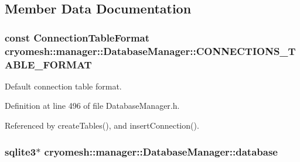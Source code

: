\subsection{\-Member \-Data \-Documentation}
\hypertarget{classcryomesh_1_1manager_1_1DatabaseManager_ad318d1adc10df5e9ad8a55252b627456}{
\subsubsection[{\-C\-O\-N\-N\-E\-C\-T\-I\-O\-N\-S\-\_\-\-T\-A\-B\-L\-E\-\_\-\-F\-O\-R\-M\-A\-T}]{\setlength{\rightskip}{0pt plus 5cm}const {\bf \-Connection\-Table\-Format} {\bf cryomesh\-::manager\-::\-Database\-Manager\-::\-C\-O\-N\-N\-E\-C\-T\-I\-O\-N\-S\-\_\-\-T\-A\-B\-L\-E\-\_\-\-F\-O\-R\-M\-A\-T}}}\label{classcryomesh_1_1manager_1_1DatabaseManager_ad318d1adc10df5e9ad8a55252b627456}


\-Default connection table format. 



\-Definition at line 496 of file \-Database\-Manager.\-h.



\-Referenced by create\-Tables(), and insert\-Connection().

\hypertarget{classcryomesh_1_1manager_1_1DatabaseManager_afa0d9b3d19f26e04dc14e5cbb018cddc}{
\subsubsection[{database}]{\setlength{\rightskip}{0pt plus 5cm}sqlite3$\ast$ {\bf cryomesh\-::manager\-::\-Database\-Manager\-::database}}}\label{classcryomesh_1_1manager_1_1DatabaseManager_afa0d9b3d19f26e04dc14e5cbb018cddc}


